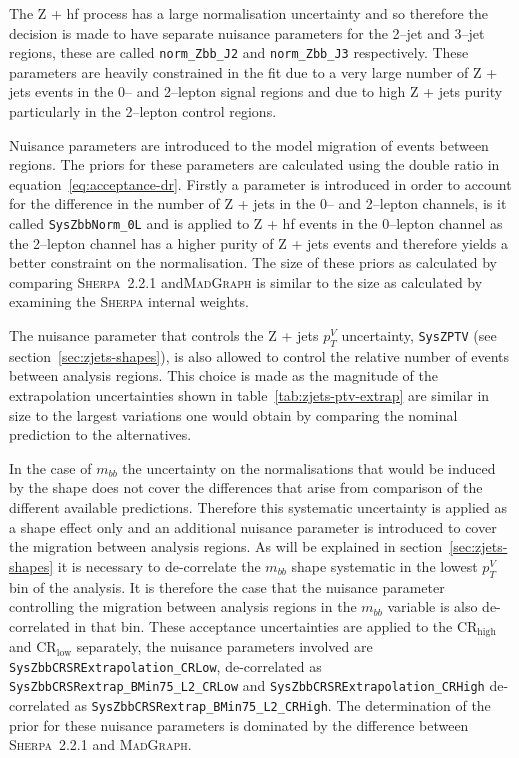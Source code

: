 The Z + hf process has a large normalisation uncertainty and so therefore the
decision is made to have separate nuisance parameters for the 2--jet and 3--jet
regions, these are called \texttt{norm\_Zbb\_J2} and \texttt{norm\_Zbb\_J3}
respectively. These parameters are heavily constrained in the fit due to a very
large number of Z + jets events in the 0-- and 2--lepton signal regions and due
to high Z + jets purity particularly in the 2--lepton control regions.

Nuisance parameters are introduced to the model migration of events between
regions. The priors for these parameters are calculated using the double ratio
in equation~\ref{eq:acceptance-dr}. Firstly a parameter is introduced in order
to account for the difference in the number of Z + jets in the 0-- and 2--lepton
channels, is it called \texttt{SysZbbNorm\_0L} and is applied to Z + hf events
in the 0--lepton channel as the 2--lepton channel has a higher purity of Z +
jets events and therefore yields a better constraint on the normalisation. The
size of these priors as calculated by comparing \textsc{Sherpa}~2.2.1
and\textsc{MadGraph} is similar to the size as calculated by examining the
\textsc{Sherpa} internal weights.

The nuisance parameter that controls the Z + jets $p_T^V$ uncertainty,
\texttt{SysZPTV} (see section~\ref{sec:zjets-shapes}), is also allowed to
control the relative number of events between analysis regions. This choice is
made as the magnitude of the extrapolation uncertainties shown in
table~\ref{tab:zjets-ptv-extrap} are similar in size to the largest variations
one would obtain by comparing the nominal prediction to the alternatives.


In the case of $m_{bb}$ the uncertainty on the normalisations that would be
induced by the shape does not cover the differences that arise from comparison
of the different available predictions. Therefore this systematic uncertainty is
applied as a shape effect only and an additional nuisance parameter is
introduced to cover the migration between analysis regions. As will be explained
in section~\ref{sec:zjets-shapes} it is necessary to de-correlate the $m_{bb}$
shape systematic in the lowest $p_T^V$ bin of the analysis. It is therefore the
case that the nuisance parameter controlling the migration between analysis
regions in the $m_{bb}$ variable is also de-correlated in that bin. These
acceptance uncertainties are applied to the CR$_{\text{high}}$ and
CR$_{\text{low}}$ separately, the nuisance parameters involved are
\texttt{SysZbbCRSRExtrapolation\_CRLow}, de-correlated as
\texttt{SysZbbCRSRextrap\_BMin75\_L2\_CRLow} and
\texttt{SysZbbCRSRExtrapolation\_CRHigh} de-correlated as
\texttt{SysZbbCRSRextrap\_BMin75\_L2\_CRHigh}. The determination of the prior
for these nuisance parameters is dominated by the difference between
\textsc{Sherpa}~2.2.1 and \textsc{MadGraph}.

